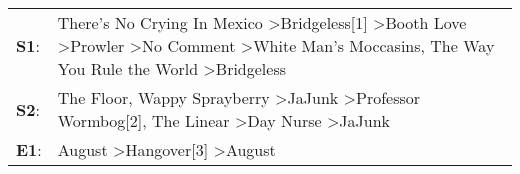 \begin{supertabular}{p{0.03\textwidth}p{0.92\textwidth}}
 \textbf{S1}:  &  There's No Crying In Mexico\textsuperscript{} \textgreater \enspace Bridgeless[1]\textsuperscript{} \textgreater \enspace Booth Love\textsuperscript{} \textgreater \enspace Prowler\textsuperscript{} \textgreater \enspace No Comment\textsuperscript{} \textgreater \enspace White Man's Moccasins\textsuperscript{}, \enspace The Way You Rule the World\textsuperscript{} \textgreater \enspace Bridgeless\textsuperscript{}  \enspace  \\
 \textbf{S2}:  &                                                                                                       The Floor\textsuperscript{}, \enspace Wappy Sprayberry\textsuperscript{} \textgreater \enspace JaJunk\textsuperscript{} \textgreater \enspace Professor Wormbog[2]\textsuperscript{}, \enspace The Linear\textsuperscript{} \textgreater \enspace Day Nurse\textsuperscript{} \textgreater \enspace JaJunk\textsuperscript{}  \enspace  \\
 \textbf{E1}:  &                                                                                                                                                                                                                                                                                                        August\textsuperscript{} \textgreater \enspace Hangover[3]\textsuperscript{} \textgreater \enspace August\textsuperscript{}  \enspace  \\
\end{supertabular}
